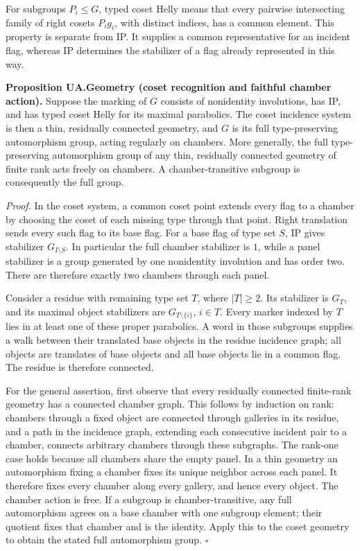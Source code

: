 \documentclass[
  11pt,
  a4paper,
]{article}
\begin{document}
For subgroups \(P_i\leq G\), typed coset Helly means that every pairwise
intersecting family of right cosets \(P_i g_i\), with distinct indices,
has a common element. This property is separate from IP. It supplies a
common representative for an incident flag, whereas IP determines the
stabilizer of a flag already represented in this way.

\textbf{Proposition UA.Geometry (coset recognition and faithful chamber
action).} Suppose the marking of \(G\) consists of nonidentity
involutions, has IP, and has typed coset Helly for its maximal
parabolics. The coset incidence system is then a thin, residually
connected geometry, and \(G\) is its full type-preserving automorphism
group, acting regularly on chambers. More generally, the full
type-preserving automorphism group of any thin, residually connected
geometry of finite rank acts freely on chambers. A chamber-transitive
subgroup is consequently the full group.

\emph{Proof.} In the coset system, a common coset point extends every
flag to a chamber by choosing the coset of each missing type through
that point. Right translation sends every such flag to its base flag.
For a base flag of type set \(S\), IP gives stabilizer
\(G_{I\setminus S}\). In particular the full chamber stabilizer is
\(1\), while a panel stabilizer is a group generated by one nonidentity
involution and has order two. There are therefore exactly two chambers
through each panel.

Consider a residue with remaining type set \(T\), where \(|T|\geq2\).
Its stabilizer is \(G_T\), and its maximal object stabilizers are
\(G_{T\setminus\{i\}}\), \(i\in T\). Every marker indexed by \(T\) lies
in at least one of these proper parabolics. A word in those subgroups
supplies a walk between their translated base objects in the residue
incidence graph; all objects are translates of base objects and all base
objects lie in a common flag. The residue is therefore connected.

For the general assertion, first observe that every residually connected
finite-rank geometry has a connected chamber graph. This follows by
induction on rank: chambers through a fixed object are connected through
galleries in its residue, and a path in the incidence graph, extending
each consecutive incident pair to a chamber, connects arbitrary chambers
through these subgraphs. The rank-one case holds because all chambers
share the empty panel. In a thin geometry an automorphism fixing a
chamber fixes its unique neighbor across each panel. It therefore fixes
every chamber along every gallery, and hence every object. The chamber
action is free. If a subgroup is chamber-transitive, any full
automorphism agrees on a base chamber with one subgroup element; their
quotient fixes that chamber and is the identity. Apply this to the coset
geometry to obtain the stated full automorphism group. \(\square\)
\end{document}
